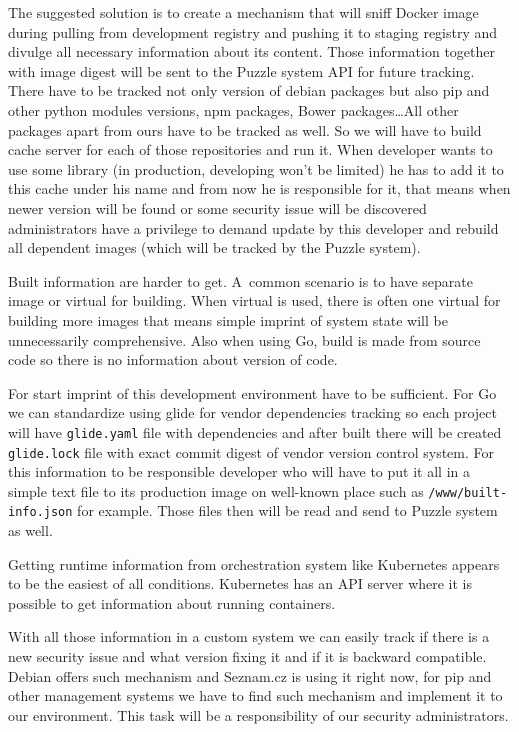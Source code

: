 The suggested solution is to create a mechanism that will sniff Docker image during pulling from development registry and pushing it to staging registry and divulge all necessary information about its content. Those information together with image digest will be sent to the Puzzle system API for future tracking. There have to be tracked not only version of debian packages but also pip and other python modules versions, npm packages, Bower \cite{bower} packages\ldots All other packages apart from ours have to be tracked as well. So we will have to build cache server for each of those repositories and run it. When developer wants to use some library (in production, developing won’t be limited) he has to add it to this cache under his name and from now he is responsible for it, that means when newer version will be found or some security issue will be discovered administrators have a privilege to demand update by this developer and rebuild all dependent images (which will be tracked by the Puzzle system).

Built information are harder to get. A~common scenario is to have separate image or virtual for building. When virtual is used, there is often one virtual for building more images that means simple imprint of system state will be unnecessarily comprehensive. Also when using Go, build is made from source code so there is no information about version of code.

For start imprint of this development environment have to be sufficient. For Go we can standardize using glide \cite{glide} for vendor dependencies tracking so each project will have \lstinline{glide.yaml} file with dependencies and after built there will be created \lstinline{glide.lock} file with exact commit digest of vendor version control system. For this information to be responsible developer who will have to put it all in a simple text file to its production image on well-known place such as \lstinline{/www/built-info.json} for example. Those files then will be read and send to Puzzle system as well.

Getting runtime information from orchestration system like Kubernetes appears to be the easiest of all conditions. Kubernetes has an API server where it is possible to get information about running containers.

With all those information in a custom system we can easily track if there is a new security issue and what version fixing it and if it is backward compatible. Debian offers such mechanism and Seznam.cz is using it right now, for pip and other management systems we have to find such mechanism and implement it to our environment. This task will be a responsibility of our security administrators.

